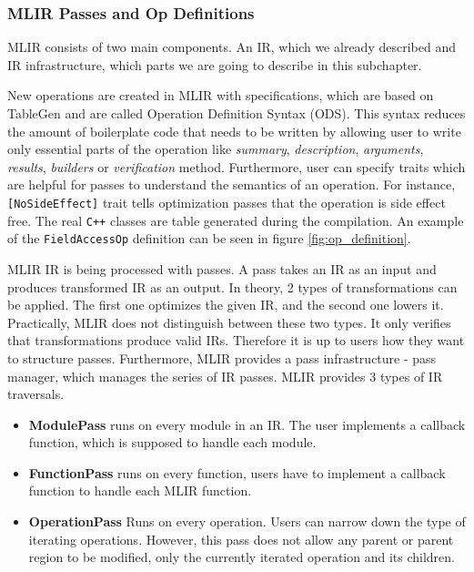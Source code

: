 \documentclass[sigplan,\review anonymous]{acmart}
\begin{document}
\subsubsection{MLIR Passes and Op Definitions}
MLIR consists of two main components. An IR, which we already described and
IR infrastructure, which parts we are going to describe in this subchapter.

New operations are created in MLIR with specifications, which are based on
TableGen \cite{tablegen} and are called Operation Definition Syntax (ODS).
This syntax reduces the amount of boilerplate code that needs to be written
by allowing user to write only essential parts of the operation like
\textit{summary}, \textit{description}, \textit{arguments}, \textit{results},
\textit{builders} or \textit{verification} method. Furthermore, user can
specify traits which are helpful for passes to understand the semantics of
an operation. For instance, \texttt{[NoSideEffect]} trait tells optimization
passes that the operation is side effect free. The real \texttt{C++} classes
are table generated during the compilation. An example of the
\texttt{FieldAccessOp} definition can be seen in figure
\ref{fig:op_definition}.

MLIR IR is being processed with passes. A pass takes an IR as an input and
produces transformed IR as an output. In theory, 2 types of transformations
can be applied. The first one optimizes the given IR, and the second one
lowers it. Practically, MLIR does not distinguish between these two types.
It only verifies that transformations produce valid IRs. Therefore it is up
to users how they want to structure passes. Furthermore, MLIR provides a pass
infrastructure - pass manager, which manages the series of IR passes. MLIR
provides 3 types of IR traversals. 

\begin{itemize}
  \item \textbf{ModulePass} runs on every module in an IR. The user implements
  a callback function, which is supposed to handle each module.

  \item \textbf{FunctionPass} runs on every function, users have to implement
  a callback function to handle each MLIR function.

  \item \textbf{OperationPass} Runs on every operation. Users can narrow down
  the type of iterating operations. However, this pass does not allow any
  parent or parent region to be modified, only the currently iterated operation
  and its children.
\end{itemize}
\end{document}
